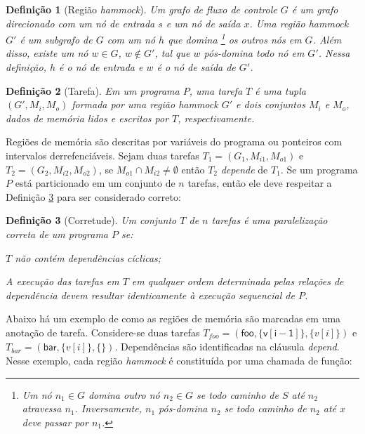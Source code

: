 \documentclass[sigconf]{acmart}
\newtheorem{Definicao}{Defini\c{c}\~{a}o}
\begin{document}
\begin{Definicao} [Região \textit{hammock}]
\label{def:hammock}
Um grafo de fluxo de controle $G$ é um grafo direcionado com um nó de entrada
$s$ e um nó de saída $x$. Uma região \textit{hammock} $G'$ é um subgrafo de $G$ com um nó $h$ que {\em domina}
\footnote{Um nó $n_1 \in G$ domina outro nó
$n_2 \in G$ se todo caminho de  $S$ até $n_2$ atravessa $n_1$.
Inversamente, $n_1$ pós-domina $n_2$ se todo caminho de $n_2$ até $x$ deve passar por $n_1$.} os outros nós em $G$.
Além disso, existe um nó $w \in G$, $w \notin G'$, tal que $w$ {\em pós-domina} todo nó em $G'$. Nessa definição,
$h$ é o nó de entrada e $w$ é o nó de saída de $G'$.  
\end{Definicao}

\begin{Definicao} [Tarefa]
\label{def:task}
Em um programa $P$, uma tarefa $T$ é uma tupla $(G', M_i, M_o)$ formada
por uma região \textit{hammock} $G'$ e dois conjuntos $M_i$ e $M_o$, dados de memória lidos e escritos por $T$, respectivamente.
\end{Definicao}

Regiões de memória são descritas por variáveis do programa ou ponteiros com intervalos derrefenciáveis.
Sejam duas tarefas $T_1 = (G_1, M_{i1}, M_{o1})$ e $T_2 = (G_2, M_{i2}, M_{o2})$, 
se $M_{o1} \cap M_{i2} \neq \emptyset$ então $T_2$ {\em depende} de $T_1$. Se um programa $P$ está particionado em um 
conjunto de $n$ tarefas, então ele deve respeitar a Definição \ref{def:corretude} para ser considerado correto:

\begin{Definicao} [Corretude]
\label{def:corretude}
Um conjunto $T$ de $n$ tarefas é uma paralelização correta de um programa $P$ se:
\begin{compactenum}
\item $T$ não contém dependências cíclicas;
\item A execução das tarefas em $T$ em qualquer ordem determinada pelas relações de dependência devem resultar
identicamente à execução sequencial de $P$.
\end{compactenum}
\end{Definicao}

Abaixo há um exemplo de como as regiões de memória são marcadas em uma anotação de tarefa.
Considere-se duas tarefas $T_{\mathit{foo}} = (\mathsf{foo}, \{\mathsf{v[i - 1]}\},
\{v[i]\})$ e $T_{\mathit{bar}} = (\mathsf{bar}, \{v[i]\}, \{\})$. Dependências são identificadas na cláusula \textit{depend}. 
Nesse exemplo, cada região \textit{hammock} é constituída por uma chamada de função:
\end{document}
